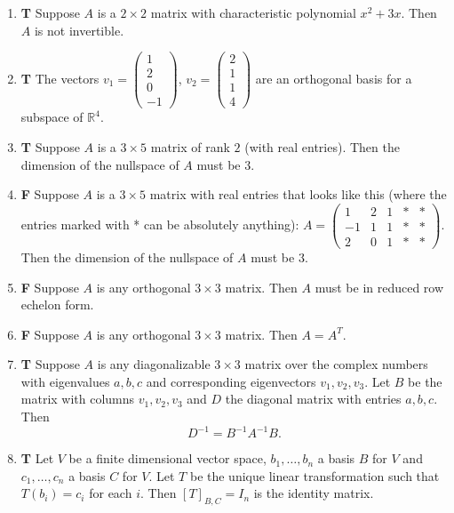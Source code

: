 \documentclass[12pt]{article}
\newcommand{\tf}[2]{\item {\bf {\color{blue}\hspace{1em}#1}}\hspace{1em} #2}
\newcommand{\R}{\mathbb{R}}
\begin{document}
\begin{enumerate}
\tf{T}{Suppose $A$ is a $2\times 2$ matrix with  characteristic polynomial $x^{2} + 3x$.  Then $A$ is not invertible.}

\tf{T}{The vectors $v_1=\left(\begin{array}{rrr}
1 \\
2  \\
0\\
-1
\end{array}\right)$,
$v_2=\left(\begin{array}{rrr}
2\\
1\\
1\\
4
\end{array}\right)$  are an orthogonal basis for a subspace of $\R^4$.}

\tf{T}{Suppose $A$ is a $3\times 5$ matrix of rank $2$ (with real entries).  Then the dimension of the nullspace of $A$ must be $3$.}

\tf{F}{Suppose $A$ is a $3\times 5$ matrix with real entries that looks like this (where the entries marked with * can be absolutely anything): $A={\left(\begin{array}{rrrrr}
1 & 2 & 1 & * & * \\
-1 & 1 & 1 & * & * \\
2 & 0 & 1 & * & *
\end{array}\right)}$.  Then the dimension of the nullspace of $A$ must be $3$.}

\tf{F}{Suppose $A$ is any orthogonal $3\times 3$ matrix.  Then $A$ must be in reduced row echelon form.}

\tf{F}{Suppose $A$ is any orthogonal $3\times 3$ matrix.  Then $A=A^T$.}

\tf{T}{Suppose $A$ is any diagonalizable $3\times 3$ matrix over the complex numbers with eigenvalues $a,b,c$ and corresponding eigenvectors $v_1, v_2, v_3$.  Let $B$ be the matrix with columns $v_1, v_2, v_3$ and $D$ the diagonal matrix with entries $a,b,c$.  Then $$D^{-1} = B^{-1} A^{-1} B.$$}

\tf{T}{Let $V$ be a finite dimensional vector space, $b_1,\ldots, b_n$ a basis $B$ for $V$
and $c_1,\ldots, c_n$ a basis $C$ for $V$.   Let $T$ be the unique linear transformation
such that $T(b_i)=c_i$ for each $i$.  Then $[T]_{B,C} = I_n$ is the identity matrix.}

\end{enumerate}
\end{document}
